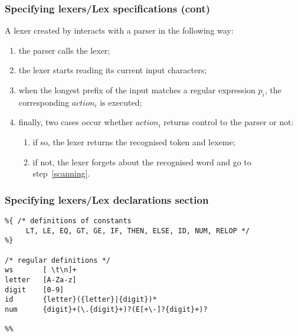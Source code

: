 % 
\begin{frame}
\frametitle{Specifying lexers/Lex specifications (cont)}
 
A lexer created by \Lex interacts with a parser in the following way:
\begin{enumerate}

  \item the parser calls the lexer;

  \item the lexer starts reading its current input
  characters; \label{scanning}

  \item when the longest prefix of the input matches a regular
    expression \(p_i\), the corresponding \(\textit{action}_i\) is
    executed;

  \item finally, two cases occur whether \(\textit{action}_i\) returns
    control to the parser or not:
    \begin{enumerate}

      \item if so, the lexer returns the recognised token and lexeme;

      \item if not, the lexer forgets about the recognised word and
      go to step~\ref{scanning}.

    \end{enumerate}

\end{enumerate}

\end{frame}

% 
\begin{frame}[containsverbatim]
\frametitle{Specifying lexers/Lex declarations section}
 
{\small
\begin{verbatim}
%{ /* definitions of constants 
     LT, LE, EQ, GT, GE, IF, THEN, ELSE, ID, NUM, RELOP */
%}

/* regular definitions */
ws       [ \t\n]+
letter   [A-Za-z]
digit    [0-9]
id       {letter}({letter}|{digit})*
num      {digit}+(\.{digit}+)?(E[+\-]?{digit}+)?

%%
\end{verbatim}
}

\end{frame}

